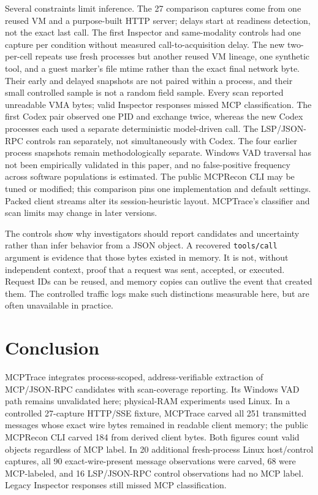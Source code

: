 \documentclass[conference,10pt]{IEEEtran}
\begin{document}
Several constraints limit inference. The 27 comparison captures come from one reused VM and a purpose-built HTTP server; delays start at readiness detection, not the exact last call. The first Inspector and same-modality controls had one capture per condition without measured call-to-acquisition delay. The new two-per-cell repeats use fresh processes but another reused VM lineage, one synthetic tool, and a guest marker's file mtime rather than the exact final network byte. Their early and delayed snapshots are not paired within a process, and their small controlled sample is not a random field sample. Every scan reported unreadable VMA bytes; valid Inspector responses missed MCP classification. The first Codex pair observed one PID and exchange twice, whereas the new Codex processes each used a separate deterministic model-driven call. The LSP/JSON-RPC controls ran separately, not simultaneously with Codex. The four earlier process snapshots remain methodologically separate. Windows VAD traversal has not been empirically validated in this paper, and no false-positive frequency across software populations is estimated. The public MCPRecon CLI may be tuned or modified; this comparison pins one implementation and default settings. Packed client streams alter its session-heuristic layout. MCPTrace's classifier and scan limits may change in later versions.

The controls show why investigators should report candidates and uncertainty rather than infer behavior from a JSON object. A recovered \texttt{tools/call} argument is evidence that those bytes existed in memory. It is not, without independent context, proof that a request was sent, accepted, or executed. Request IDs can be reused, and memory copies can outlive the event that created them. The controlled traffic logs make such distinctions measurable here, but are often unavailable in practice.

\balance
\section{Conclusion}
MCPTrace integrates process-scoped, address-verifiable extraction of MCP/JSON-RPC candidates with scan-coverage reporting. Its Windows VAD path remains unvalidated here; physical-RAM experiments used Linux. In a controlled 27-capture HTTP/SSE fixture, MCPTrace carved all 251 transmitted messages whose exact wire bytes remained in readable client memory; the public MCPRecon CLI carved 184 from derived client bytes. Both figures count valid objects regardless of MCP label. In 20 additional fresh-process Linux host/control captures, all 90 exact-wire-present message observations were carved, 68 were MCP-labeled, and 16 LSP/JSON-RPC control observations had no MCP label. Legacy Inspector responses still missed MCP classification.
\end{document}
